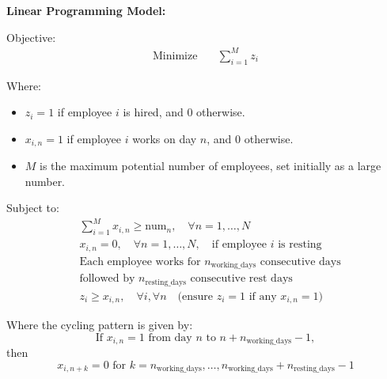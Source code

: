 \documentclass{article}
\begin{document}
\textbf{Linear Programming Model:}

Objective:
\begin{align}
    \text{Minimize} \quad & \sum_{i=1}^{M} z_i
\end{align}

Where:
\begin{itemize}
    \item \(z_i = 1\) if employee \(i\) is hired, and 0 otherwise.
    \item \(x_{i,n} = 1\) if employee \(i\) works on day \(n\), and 0 otherwise.
    \item \(M\) is the maximum potential number of employees, set initially as a large number.
\end{itemize}

Subject to:
\begin{align}
    & \sum_{i=1}^{M} x_{i,n} \geq \text{num}_n, \quad \forall n = 1, \ldots, N \\
    & x_{i,n} = 0, \quad \forall n = 1, \ldots, N, \quad \text{if employee } i \text{ is resting} \\
    & \text{Each employee works for } n_{\text{working\_days}} \text{ consecutive days} \\
    & \text{followed by } n_{\text{resting\_days}} \text{ consecutive rest days} \\
    & z_i \geq x_{i,n}, \quad \forall i, \forall n \quad \text{(ensure } z_i = 1 \text{ if any } x_{i,n} = 1 \text{)}
\end{align}

Where the cycling pattern is given by:
\[
\text{If } x_{i,n} = 1 \text{ from day } n \text{ to } n + n_{\text{working\_days}} - 1, 
\]
then
\[
x_{i,n+k} = 0 \text{ for } k = n_{\text{working\_days}}, \ldots, n_{\text{working\_days}} + n_{\text{resting\_days}} - 1
\]
\end{document}

